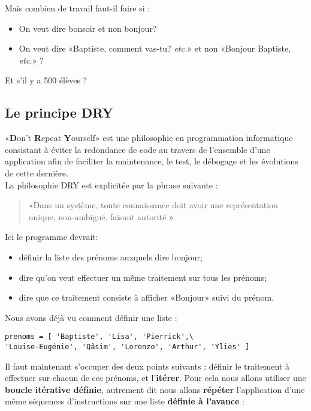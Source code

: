 Mais combien de travail faut-il faire si :

\begin{itemize}
\item On veut dire bonsoir et non bonjour?
\item On veut dire «Baptiste, comment vas-tu? \textit{etc.}» et non
  «Bonjour Baptiste, \textit{etc.}» ?
\end{itemize}

Et s'il y a 500 élèves ?


\subsection{Le principe DRY}

«\textbf{D}on't \textbf{R}epeat \textbf{Y}ourself» est une philosophie en programmation 
informatique consistant à éviter la redondance de code au travers de l'ensemble d'une application 
afin de faciliter la maintenance, le test, le débogage et les évolutions de cette dernière.\\
La philosophie DRY est explicitée par la phrase suivante :\\

\begin{quote}
  «Dans un système, toute connaissance doit avoir une représentation
   unique, non-ambiguë, faisant autorité ».
\end{quote}

Ici le programme devrait:
\begin{itemize}
\item définir la liste des prénoms auxquels dire bonjour;
\item dire qu'on veut effectuer un même traitement sur tous les prénoms;
\item dire que ce traitement consiste à afficher «Bonjour» suivi du prénom.
\end{itemize}


Nous avons déjà vu comment définir une liste :

\begin{lstlisting}
prenoms = [ 'Baptiste', 'Lisa', 'Pierrick',\
'Louise-Eugénie', 'Qâsim', 'Lorenzo', 'Arthur', 'Ylies' ]
\end{lstlisting}

Il faut maintenant s'occuper des deux points suivants : définir le traitement à effectuer sur 
chacun de ces 
prénoms, et l'\textbf{itérer}. Pour cela nous allons utiliser une \textbf{boucle itérative 
définie}, autrement dit nous allons \textbf{répéter} l'application d'une même séquences
d'instructions 
sur une liste \textbf{définie à l'avance} :\\


